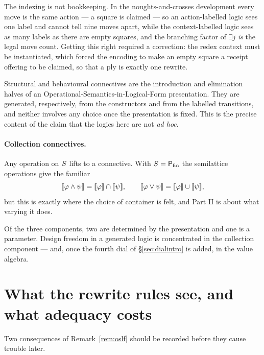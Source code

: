 The indexing is not bookkeeping. In the noughts-and-crosses development
\cite{GameNote} every move is the same action --- a square is claimed --- so an
action-labelled logic sees one label and cannot tell nine moves apart, while the
context-labelled logic sees as many labels as there are empty squares, and the
branching factor of $\exists j$ \emph{is} the legal move count. Getting this
right required a correction: the redex context must be instantiated, which forced
the encoding to make an empty square a receipt offering to be claimed, so that a
ply is exactly one rewrite.

\begin{remark}
\label{rem:oslf}
Structural and behavioural connectives are the introduction and elimination
halves of an Operational-Semantics-in-Logical-Form presentation. They are
generated, respectively, from the constructors and from the labelled transitions,
and neither involves any choice once the presentation is fixed. This is the
precise content of the claim that the logics here are not \emph{ad hoc}.
\end{remark}

\paragraph{Collection connectives.} Any operation on $S$ lifts to a
connective. With $S = \mathsf{P}_{\mathrm{fin}}$ the semilattice operations give the familiar
\[
  \llbracket \varphi \wedge \psi \rrbracket = \llbracket \varphi \rrbracket \cap \llbracket \psi \rrbracket,
  \qquad
  \llbracket \varphi \vee \psi \rrbracket = \llbracket \varphi \rrbracket \cup \llbracket \psi \rrbracket,
\]
but this is exactly where the choice of container is felt, and Part II is about
what varying it does.

\begin{principle}
\label{prin:freedom}
Of the three components, two are determined by the presentation and one is a
parameter. Design freedom in a generated logic is concentrated in the collection
component --- and, once the fourth dial of \S\ref{sec:dialintro} is added, in the
value algebra.
\end{principle}

\section{What the rewrite rules see, and what adequacy costs}
\label{sec:adequacy}

Two consequences of Remark~\ref{rem:oslf} should be recorded before they cause
trouble later.


